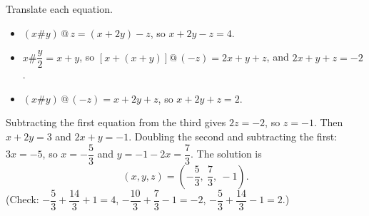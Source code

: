 Translate each equation.
\begin{itemize}
\item $(x\#y)\,@\,z=(x+2y)-z$, so $x+2y-z=4$.
\item $x\#\dfrac {y}{2}=x+y$, so $\left[x+(x+y)\right]@\,(-z)=2x+y+z$, and $2x+y+z=-2$.
\item $(x\#y)\,@\,(-z)=x+2y+z$, so $x+2y+z=2$.
\end{itemize}
Subtracting the first equation from the third gives $2z=-2$, so $z=-1$. Then $x+2y=3$ and $2x+y=-1$. Doubling the second and subtracting the first: $3x=-5$, so $x=-\dfrac{5}{3}$ and $y=-1-2x=\dfrac{7}{3}$. The solution is
\[
\boxed{(x,y,z)=\left(-\dfrac{5}{3},\ \dfrac{7}{3},\ -1\right)}.
\]
(Check: $-\dfrac{5}{3}+\dfrac{14}{3}+1=4$, $-\dfrac{10}{3}+\dfrac{7}{3}-1=-2$, $-\dfrac{5}{3}+\dfrac{14}{3}-1=2$.)
